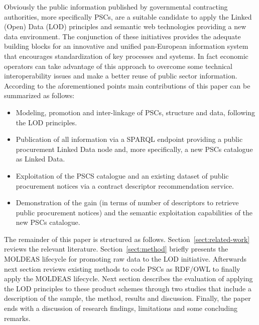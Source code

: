 Obviously the public information published by governmental contracting authorities, more specifically PSCs, are a suitable candidate to apply the Linked (Open) Data 
(LOD) principles and semantic web technologies providing a new data environment. The conjunction of these initiatives provides the adequate building blocks for an 
innovative and unified pan-European information system that encourages standardization of key processes and systems. In fact economic operators can 
take advantage of this approach to overcome some technical interoperability issues and make a better reuse of public sector information. According to the 
aforementioned points main contributions of this paper can be summarized as follows:
\begin{itemize}
\item Modeling, promotion and inter-linkage of PSCs, structure and data, following the LOD principles.
\item Publication of all information via a SPARQL endpoint providing a public procurement Linked Data node and, more specifically, a new PSCs catalogue as Linked Data.
\item Exploitation of the PSCS catalogue and an existing dataset of public procurement notices via a contract descriptor recommendation service.
\item Demonstration of the gain (in terms of number of descriptors to retrieve public procurement notices) and the semantic exploitation 
capabilities of the new PSCs catalogue.
\end{itemize}

The remainder of this paper is structured as follows. Section~\ref{sect:related-work} reviews the relevant literature. 
Section~\ref{sect:method} briefly presents the MOLDEAS lifecycle for promoting raw data to the LOD initiative. 
Afterwards next section reviews existing methods to code PSCs as RDF/OWL to finally apply the MOLDEAS lifecycle. 
Next section describes the evaluation of applying the LOD principles to these product 
schemes through two studies that include a description of the sample, the method, results and discussion. Finally, 
the paper ends with a discussion of research findings, limitations and some concluding remarks.
